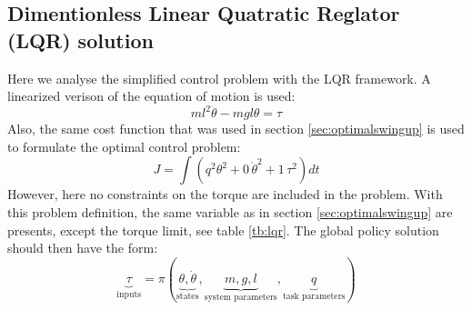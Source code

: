 \newpage
\subsection{ Dimentionless Linear Quatratic Reglator (LQR) solution}

Here we analyse the simplified control problem with the LQR framework. A linearized verison of the equation of motion is used:
\begin{equation}
ml^2 \ddot{\theta} - mgl \theta = \tau
\label{eq:pendulum_dynamics_lqr}
\end{equation}
Also, the same cost function that was used in section \ref{sec:optimalswingup} is used to formulate the optimal control problem:
\begin{equation}
J = \int{( q^2 \theta^2 + 0 \, \dot{\theta}^2 + 1 \, \tau^2 ) dt }
\label{eq:pendulum_cost_lqr}
\end{equation}
However, here no constraints on the torque are included in the problem. With this problem definition, the same variable as in section \ref{sec:optimalswingup} are presents, except the torque limit, see table \ref{tb:lqr}. The global policy solution should then have the form:
\begin{equation}
\underbrace{\tau}_{\text{inputs}}
=
\pi \left(
\underbrace{ \theta, \dot{\theta} }_{\text{states}},
\underbrace{ m , g , l }_{\text{system parameters}},
\underbrace{ q }_{\text{task parameters}}
\right)
\label{eq:lqr_policy}
\end{equation}
